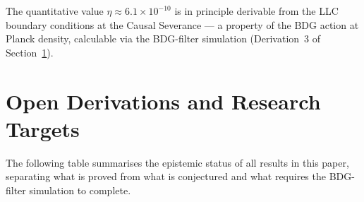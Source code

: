 \documentclass[11pt,a4paper]{article}
\begin{document}
The quantitative value $\eta \approx 6.1 \times 10^{-10}$ is
in principle derivable from the LLC boundary conditions at the
Causal Severance --- a property of the BDG action at Planck density,
calculable via the BDG-filter simulation (Derivation~3 of
Section~\ref{sec:open}).


\section{Open Derivations and Research Targets}
\label{sec:open}

The following table summarises the epistemic status of all results in this
paper, separating what is proved from what is conjectured and what requires
the BDG-filter simulation to complete.
\end{document}
